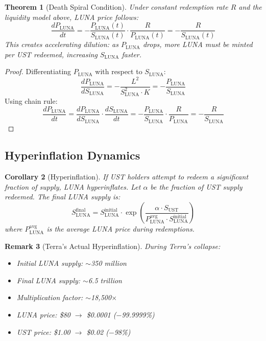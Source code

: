 \documentclass[11pt,a4paper]{article}
\newtheorem{theorem}{Theorem}[section]
\newtheorem{corollary}[theorem]{Corollary}
\newtheorem{remark}[theorem]{Remark}
\begin{document}
\begin{theorem}[Death Spiral Condition]
Under constant redemption rate $R$ and the liquidity model above, LUNA price follows:
\begin{equation}
\frac{dP_{\text{LUNA}}}{dt} = -\frac{P_{\text{LUNA}}(t)}{S_{\text{LUNA}}(t)} \cdot \frac{R}{P_{\text{LUNA}}(t)} = -\frac{R}{S_{\text{LUNA}}(t)}
\end{equation}
This creates accelerating dilution: as $P_{\text{LUNA}}$ drops, more LUNA must be minted per UST redeemed, increasing $S_{\text{LUNA}}$ faster.
\end{theorem}

\begin{proof}
Differentiating $P_{\text{LUNA}}$ with respect to $S_{\text{LUNA}}$:
\begin{equation}
\frac{dP_{\text{LUNA}}}{dS_{\text{LUNA}}} = -\frac{L^2}{S_{\text{LUNA}}^2 \cdot K} = -\frac{P_{\text{LUNA}}}{S_{\text{LUNA}}}
\end{equation}
Using chain rule:
\begin{equation}
\frac{dP_{\text{LUNA}}}{dt} = \frac{dP_{\text{LUNA}}}{dS_{\text{LUNA}}} \cdot \frac{dS_{\text{LUNA}}}{dt} = -\frac{P_{\text{LUNA}}}{S_{\text{LUNA}}} \cdot \frac{R}{P_{\text{LUNA}}} = -\frac{R}{S_{\text{LUNA}}}
\end{equation}
\end{proof}

\subsection{Hyperinflation Dynamics}

\begin{corollary}[Hyperinflation]
If UST holders attempt to redeem a significant fraction of supply, LUNA hyperinflates. Let $\alpha$ be the fraction of UST supply redeemed. The final LUNA supply is:
\begin{equation}
S_{\text{LUNA}}^{\text{final}} = S_{\text{LUNA}}^{\text{initial}} \cdot \exp\left(\frac{\alpha \cdot S_{\text{UST}}}{P_{\text{LUNA}}^{\text{avg}} \cdot S_{\text{LUNA}}^{\text{initial}}}\right)
\end{equation}
where $P_{\text{LUNA}}^{\text{avg}}$ is the average LUNA price during redemptions.
\end{corollary}

\begin{remark}[Terra's Actual Hyperinflation]
During Terra's collapse:
\begin{itemize}
    \item Initial LUNA supply: $\sim$350 million
    \item Final LUNA supply: $\sim$6.5 trillion
    \item Multiplication factor: $\sim$18,500$\times$
    \item LUNA price: \$80 $\to$ \$0.0001 ($-$99.9999\%)
    \item UST price: \$1.00 $\to$ \$0.02 ($-$98\%)
\end{itemize}
\end{remark}
\end{document}
